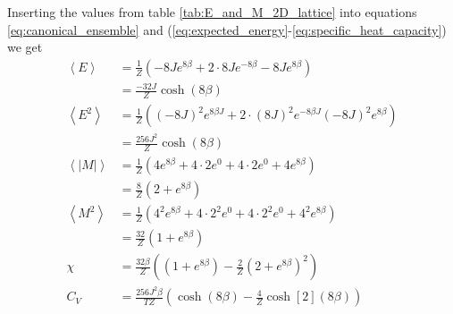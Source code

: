\documentclass[reprint, english,notitlepage,nofootinbib]{revtex4-1}  %
\begin{document}
Inserting the values from table \ref{tab:E_and_M_2D_lattice} into equations \eqref{eq:canonical_ensemble} and (\ref{eq:expected_energy}-\ref{eq:specific_heat_capacity}) we get
\begin{align*}
	\left<E\right> &= \frac{1}{Z}\left(-8Je^{8\beta} + 2\cdot 8Je^{-8\beta } - 8J e^{8\beta }\right) \\
	&= \frac{-32J}{Z}\cosh(8\beta )\\
	\left<E^2\right> &= \frac{1}{Z}\left((-8J)^2e^{8\beta J} + 2\cdot (8J)^2e^{-8\beta J} (- 8J)^2 e^{8\beta }\right) \\
	&= \frac{256J^2}{Z}\cosh(8\beta)\\
	\left<|M|\right> &= \frac{1}{Z}\left(4e^{8\beta } + 4\cdot 2e^{0} + 4\cdot 2 e^{0} + 4e^{8\beta }\right) \\
	&= \frac{8}{Z}\left(2 + e^{8\beta }\right)\\
	\left<M^2\right> &= \frac{1}{Z}\left(4^2e^{8\beta } + 4\cdot 2^2e^{0} + 4\cdot 2^2 e^{0} + 4^2e^{8\beta }\right) \\
	&= \frac{32}{Z}\left(1 + e^{8\beta }\right)\\
	\chi &= \frac{32\beta}{Z}\left(\left(1 + e^{8\beta }\right) - \frac{2}{Z}\left(2 + e^{8\beta }\right)^2 \right)\\
	C_V &= \frac{256J^2\beta}{TZ}\left(\cosh(8\beta) - \frac{4}{Z}\cosh[2](8\beta)\right)
\end{align*}
\end{document}
